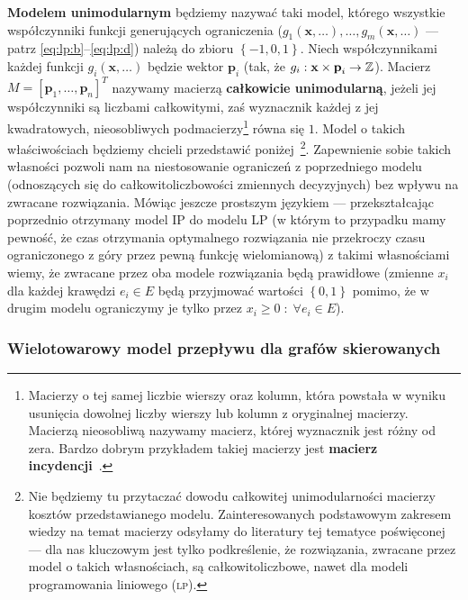 \textbf{Modelem unimodularnym} będziemy nazywać taki model, którego wszystkie współczynniki funkcji generujących ograniczenia ($g_{1} \left( \textbf{x}, \dots \right), \dots, g_{m} \left( \textbf{x}, \dots \right)$ --- patrz \ref{eq:lp:b}--\ref{eq:lp:d}) należą do zbioru $\left\{ -1, 0, 1 \right\}$. Niech współczynnikami każdej funkcji $g_{i} \left( \textbf{x}, \dots \right)$ będzie wektor $\textbf{p}_{i}$ (tak, że $g_{i}: \textbf{x} \times \textbf{p}_{i} \rightarrow \mathbb{Z}$). Macierz $M = \left[ \textbf{p}_{1}, \dots, \textbf{p}_{n} \right]^{T}$ nazywamy macierzą \textbf{całkowicie unimodularną}, jeżeli jej współczynniki są liczbami całkowitymi, zaś wyznacznik każdej z jej kwadratowych, nieosobliwych podmacierzy\footnote{Macierzy o tej samej liczbie wierszy oraz kolumn, która powstała w wyniku usunięcia dowolnej liczby wierszy lub kolumn z oryginalnej macierzy. Macierzą nieosobliwą nazywamy macierz, której wyznacznik jest różny od zera. Bardzo dobrym przykładem takiej macierzy jest \textbf{macierz incydencji}~\cite[$4$]{Strzalka2015}.} równa się $1$. Model o takich właściwościach będziemy chcieli przedstawić poniżej~\cite[$42$--$46$]{Magnanti1995503}\footnote{Nie będziemy tu przytaczać dowodu całkowitej unimodularności macierzy kosztów przedstawianego modelu. Zainteresowanych podstawowym zakresem wiedzy na temat macierzy odsyłamy do literatury tej tematyce poświęconej --- dla nas kluczowym jest tylko podkreślenie, że rozwiązania, zwracane przez model o takich własnościach, są całkowitoliczbowe, nawet dla modeli programowania liniowego (\textsc{lp}).}. Zapewnienie sobie takich własności pozwoli nam na niestosowanie ograniczeń z poprzedniego modelu (odnoszących się do całkowitoliczbowości zmiennych decyzyjnych) bez wpływu na zwracane rozwiązania. Mówiąc jeszcze prostszym językiem --- przekształcając poprzednio otrzymany model \textsc{IP} do modelu \textsc{LP} (w którym to przypadku mamy pewność, że czas otrzymania optymalnego rozwiązania nie przekroczy czasu ograniczonego z góry przez pewną funkcję wielomianową) z takimi własnościami wiemy, że zwracane przez oba modele rozwiązania będą prawidłowe (zmienne $x_{i}$ dla każdej krawędzi $e_{i} \in E$ będą przyjmować wartości $\left\{ 0, 1 \right\}$ pomimo, że w drugim modelu ograniczymy je tylko przez $x_{i} \geqslant 0 \; : \; \forall e_{i} \in E$).

\subsubsection{Wielotowarowy model przepływu dla grafów skierowanych} 

